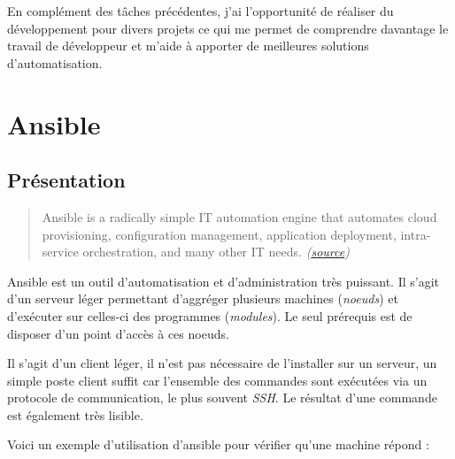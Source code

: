 \documentclass[12pt,a4paper]{article}
\newenvironment{Shaded}{}{}
\newcommand{\KeywordTok}[1]{\textcolor[rgb]{0.00,0.44,0.13}{\textbf{{#1}}}}
\newcommand{\StringTok}[1]{\textcolor[rgb]{0.25,0.44,0.63}{{#1}}}
\newcommand{\NormalTok}[1]{{#1}}
\begin{document}
  \bigskip

  En complément des tâches précédentes, j'ai l'opportunité de réaliser du
  développement pour divers projets ce qui me permet de comprendre
  davantage le travail de développeur et m'aide à apporter de meilleures
  solutions d'automatisation.

  \newpage

  \section{Ansible}\label{ansible}

  \subsection{Présentation}\label{pruxe9sentation}

  \begin{quote}
  Ansible is a radically simple IT automation engine that automates cloud
  provisioning, configuration management, application deployment,
  intra-service orchestration, and many other IT needs.
  \emph{(\href{https://www.ansible.com/how-ansible-works}{source})}
  \end{quote}

  \bigskip
  Ansible est un outil d'automatisation et d'administration très puissant.
  Il s'agit d'un serveur léger permettant d'aggréger plusieurs machines
  (\emph{noeuds}) et d'exécuter sur celles-ci des programmes
  (\emph{modules}). Le seul prérequis est de disposer d'un point d'accès à
  ces noeuds.

  \bigskip

  Il s'agit d'un client léger, il n'est pas nécessaire de l'installer sur
  un serveur, un simple poste client suffit car l'ensemble des commandes
  sont exécutées via un protocole de communication, le plus souvent
  \emph{SSH}. Le résultat d'une commande est également très lisible.

  \bigskip

  Voici un exemple d'utilisation d'ansible pour vérifier qu'une machine
  répond :

  \begin{Shaded}
  \end{Shaded}
\end{document}
